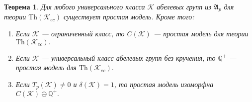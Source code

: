 \documentclass[14pt]{extarticle} %
\newtheorem{theorem}{Теорема}[section]
\def\A{{\mathfrak{A}}}
\def\K{{\mathcal{K}}}
\def\Q{{\mathbb{Q}}}
\def\Th{{\mathrm{Th}}}
\begin{document}
\begin{theorem}
Для любого универсального класса $\K$ абелевых групп из $\A_p$ для теории $\Th(\K_{ec})$ существует простая модель. Кроме того:
\begin{enumerate}
\item Если $\K$ --- ограниченный класс, то $C(\K)$ --- простая модель для теории $\Th(\K_{ec}).$
\item Если $\K$ --- универсальный класс абелевых групп без кручения, то $\Q^+$ --- простая модель для $\Th(\K_{ec}).$
\item Если $T_p(\K) \neq 0$ и $\delta(\K) = 1$, то простая модель изоморфна $C(\K) \oplus \Q^+.$
\end{enumerate}
\end{theorem}

% 





\end{document}
